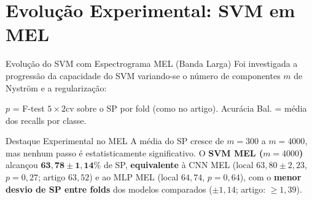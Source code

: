 \documentclass[aspectratio=169]{beamer}
\begin{document}
\section{Evolu\c{c}\~{a}o Experimental: SVM em MEL}

\begin{frame}{Evolu\c{c}\~{a}o do SVM com Espectrograma MEL (Banda Larga)}
    \small
    Foi investigada a progress\~{a}o da capacidade do SVM variando-se o n\'{u}mero de componentes $m$ de Nystr\"{o}m e a regulariza\c{c}\~{a}o:
    
    \vspace{0.1cm}
    \begin{table}[h]
    \centering
    \end{table}
    \vspace{-0.2cm}
    {\tiny $p$ = F-test $5\times2$cv sobre o SP por fold (como no artigo). Acur\'{a}cia Bal. = m\'{e}dia dos recalls por classe.\par}

    \vspace{0.05cm}
    \begin{block}{Destaque Experimental no MEL}
        A m\'{e}dia do SP cresce de $m=300$ a $m=4000$, mas nenhum passo \'{e} estatisticamente significativo. O \textbf{SVM MEL ($m=4000$)} alcan\c{c}ou $\mathbf{63,78 \pm 1,14\%}$ de SP, \textbf{equivalente} \`{a} CNN MEL (local $63,80 \pm 2,23$, $p=0,27$; artigo $63,52$) e ao MLP MEL (local $64,74$, $p=0,64$), com o \textbf{menor desvio de SP entre folds} dos modelos comparados ($\pm 1,14$; artigo: $\ge 1,39$).
    \end{block}
\end{frame}
\end{document}
